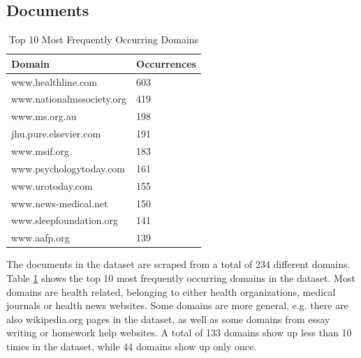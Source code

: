 \subsection{Documents}
\begin{table}[tb]
\centering
\begin{tabular}{ll}
\hline
\textbf{Domain} & \textbf{Occurrences} \\
\hline
www.healthline.com & 603 \\
www.nationalmssociety.org & 419 \\
www.ms.org.au & 198 \\
jhu.pure.elsevier.com & 191 \\
www.msif.org & 183 \\
www.psychologytoday.com & 161 \\
www.urotoday.com & 155 \\
www.news-medical.net & 150 \\
www.sleepfoundation.org & 141 \\
www.aafp.org & 139 \\
\hline
\end{tabular}
\caption{Top 10 Most Frequently Occurring Domains}
\label{tab:top_domains}
\end{table}
The documents in the dataset are scraped from a total of 234 different domains.
Table \ref{tab:top_domains} shows the top 10 most frequently occurring domains in the dataset.
Most domains are health related, belonging to either health organizations, medical journals or health news websites.
Some domains are more general, e.g. there are also wikipedia.org pages in the dataset, as well as some domains from essay writing or homework help websites.
A total of 133 domains show up less than 10 times in the dataset, while 44 domains show up only once.


